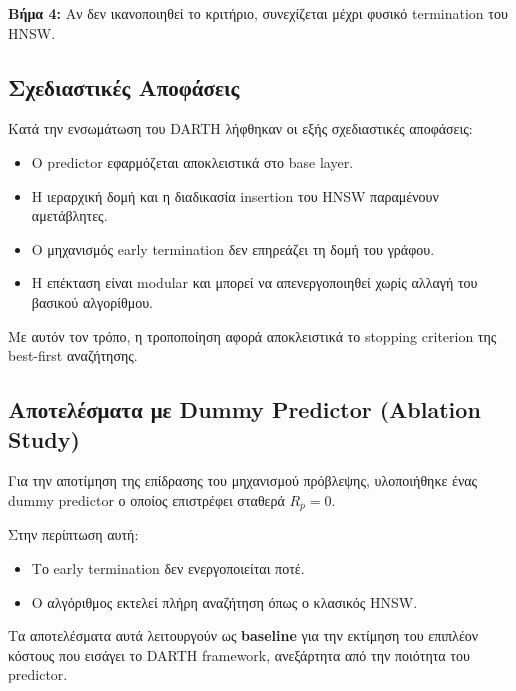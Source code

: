 \documentclass[12pt,a4paper]{article}
\begin{document}
\textbf{Βήμα 4:} Αν δεν ικανοποιηθεί το κριτήριο, συνεχίζεται μέχρι φυσικό termination του HNSW.

\subsection{Σχεδιαστικές Αποφάσεις}
Κατά την ενσωμάτωση του DARTH λήφθηκαν οι εξής σχεδιαστικές αποφάσεις:

\begin{itemize}
\item Ο predictor εφαρμόζεται αποκλειστικά στο base layer.
\item Η ιεραρχική δομή και η διαδικασία insertion του HNSW παραμένουν αμετάβλητες.
\item Ο μηχανισμός early termination δεν επηρεάζει τη δομή του γράφου.
\item Η επέκταση είναι modular και μπορεί να απενεργοποιηθεί χωρίς αλλαγή του βασικού αλγορίθμου.
\end{itemize}

Με αυτόν τον τρόπο, η τροποποίηση αφορά αποκλειστικά το stopping criterion της best-first αναζήτησης.

\subsection{Αποτελέσματα με Dummy Predictor (Ablation Study)}
Για την αποτίμηση της επίδρασης του μηχανισμού πρόβλεψης, υλοποιήθηκε ένας dummy predictor ο οποίος επιστρέφει σταθερά $R_p = 0$.

Στην περίπτωση αυτή:

\begin{itemize}
\item Το early termination δεν ενεργοποιείται ποτέ.
\item Ο αλγόριθμος εκτελεί πλήρη αναζήτηση όπως ο κλασικός HNSW.
\end{itemize}

Τα αποτελέσματα αυτά λειτουργούν ως \textbf{baseline} για την εκτίμηση του επιπλέον κόστους που εισάγει το DARTH framework, ανεξάρτητα από την ποιότητα του predictor.
\end{document}
